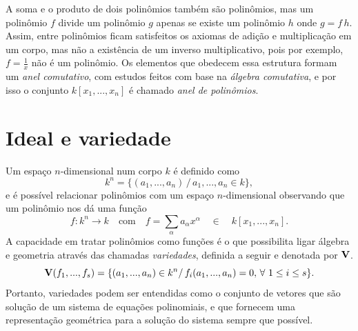 \documentclass[a4paper,12pt,oneside,onecolumn,final,fleqn]{repUERJ}
\begin{document}
A soma e o produto de dois polinômios também são polinômios, mas um polinômio $f$ divide um polinômio $g$ apenas se existe um polinômio $h$ onde $g=f\,h$. Assim, entre polinômios ficam satisfeitos os axiomas de adição e multiplicação em um corpo, mas não a existência de um inverso multiplicativo, pois por exemplo, $f=\frac{1}{x}$ não é um polinômio. Os elementos que obedecem essa estrutura formam um {\it anel comutativo}, com estudos feitos com base na {\it álgebra comutativa}, e por isso o conjunto $k[x_1,...,x_n]$ é chamado {\it anel de polinômios}.

\section{Ideal e variedade}
Um espaço $n$-dimensional num corpo $k$ é definido como
\begin{equation*}
k^n=\{(a_1,...,a_n)\,/\, a_1,...,a_n\in k\},
\end{equation*}
e é possível relacionar polinômios com um espaço $n$-dimensional observando que um polinômio nos dá uma função
\begin{equation*}
f:k^n\rightarrow k\quad\text{com}\quad f=\sum_\alpha a_\alpha x^\alpha\quad \in\quad k[x_1,...,x_n].
\end{equation*}
A capacidade em tratar polinômios como funções é o que possibilita ligar álgebra e geometria através das chamadas {\it variedades}, definida a seguir e denotada por ${\bf V}$.
\begin{equation*}
{\bf V}(f_1,...,f_s)=\{(a_1,...,a_n)\in k^n/\, f_i(a_1,...,a_n)=0, \,\forall\,\, 1\le i\le s\}.
\end{equation*}
Portanto, variedades podem ser entendidas como o conjunto de vetores que são solução de um sistema de equações polinomiais, e que fornecem uma representação geométrica para a solução do sistema sempre que possível.
\end{document}
